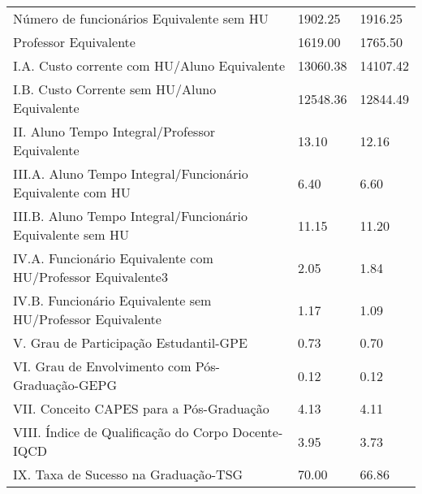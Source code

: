 \documentclass{article}
\begin{document}
\begin{tabular}{lll}
Número de funcionários Equivalente sem HU                   &  1902.25 &  1916.25 \\
Professor Equivalente                                       &  1619.00 &  1765.50 \\
I.A. Custo corrente com HU/Aluno Equivalente                &  13060.38 &  14107.42 \\
I.B. Custo Corrente sem HU/Aluno Equivalente                &  12548.36 &  12844.49 \\
II. Aluno Tempo Integral/Professor Equivalente              &  13.10 &  12.16 \\
III.A. Aluno Tempo Integral/Funcionário Equivalente com HU  &  6.40 &  6.60 \\
III.B. Aluno Tempo Integral/Funcionário Equivalente sem HU  &  11.15 &  11.20 \\
IV.A. Funcionário Equivalente com HU/Professor Equivalente3 &  2.05 &  1.84 \\
IV.B. Funcionário Equivalente sem HU/Professor Equivalente  &  1.17 &  1.09 \\
V. Grau de Participação Estudantil-GPE                      &  0.73 &  0.70 \\
VI. Grau de Envolvimento com Pós-Graduação-GEPG             &  0.12 &  0.12 \\
VII. Conceito CAPES para a Pós-Graduação                    &  4.13 &  4.11 \\
VIII. Índice de Qualificação do Corpo Docente-IQCD          &  3.95 &  3.73 \\
IX. Taxa de Sucesso na Graduação-TSG                        &  70.00 &  66.86 \\
\bottomrule
\end{tabular}
\newpage
\end{document}
